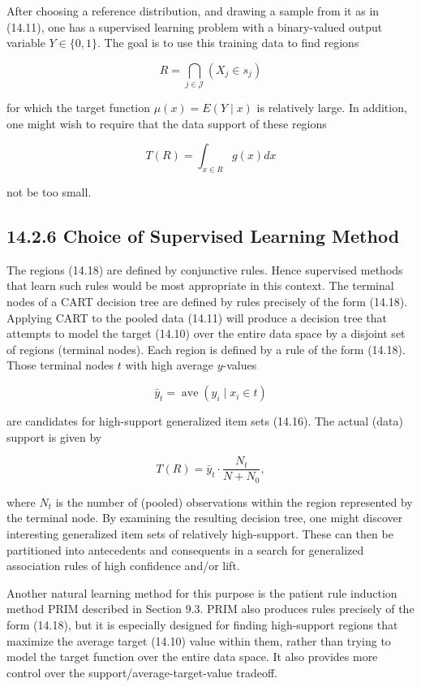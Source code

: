 \documentclass[10pt]{article}
\begin{document}
After choosing a reference distribution, and drawing a sample from it as in (14.11), one has a supervised learning problem with a binary-valued output variable $Y \in\{0,1\}$. The goal is to use this training data to find regions


\begin{equation*}
R=\bigcap_{j \in \mathcal{J}}\left(X_{j} \in s_{j}\right) \tag{14.18}
\end{equation*}


for which the target function $\mu(x)=E(Y \mid x)$ is relatively large. In addition, one might wish to require that the data support of these regions


\begin{equation*}
T(R)=\int_{x \in R} g(x) d x \tag{14.19}
\end{equation*}


not be too small.

\subsection*{14.2.6 Choice of Supervised Learning Method}
The regions (14.18) are defined by conjunctive rules. Hence supervised methods that learn such rules would be most appropriate in this context. The terminal nodes of a CART decision tree are defined by rules precisely of the form (14.18). Applying CART to the pooled data (14.11) will produce a decision tree that attempts to model the target (14.10) over the entire data space by a disjoint set of regions (terminal nodes). Each region is defined by a rule of the form (14.18). Those terminal nodes $t$ with high average $y$-values

$$
\bar{y}_{t}=\operatorname{ave}\left(y_{i} \mid x_{i} \in t\right)
$$

are candidates for high-support generalized item sets (14.16). The actual (data) support is given by

$$
T(R)=\bar{y}_{t} \cdot \frac{N_{t}}{N+N_{0}},
$$

where $N_{t}$ is the number of (pooled) observations within the region represented by the terminal node. By examining the resulting decision tree, one might discover interesting generalized item sets of relatively high-support. These can then be partitioned into antecedents and consequents in a search for generalized association rules of high confidence and/or lift.

Another natural learning method for this purpose is the patient rule induction method PRIM described in Section 9.3. PRIM also produces rules precisely of the form (14.18), but it is especially designed for finding high-support regions that maximize the average target (14.10) value within them, rather than trying to model the target function over the entire data space. It also provides more control over the support/average-target-value tradeoff.
\end{document}
